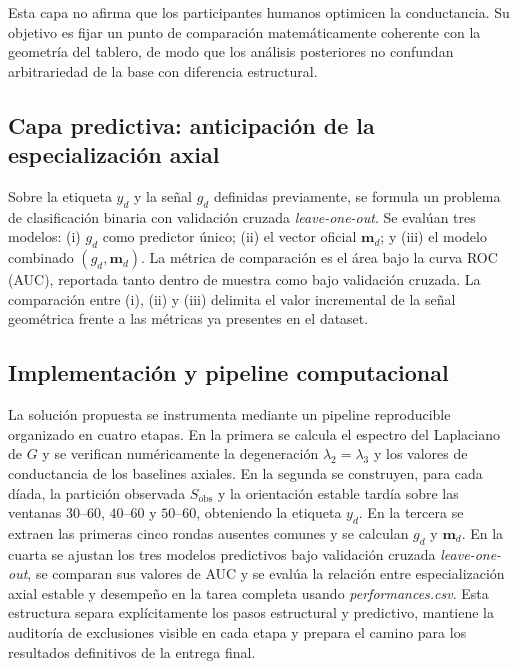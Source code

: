 \documentclass[journal]{IEEEtran}
\newcommand{\Sobs}{S_{\mathrm{obs}}}
\begin{document}
Esta capa no afirma que los participantes humanos optimicen la conductancia. Su objetivo es fijar un punto de comparación matemáticamente coherente con la geometría del tablero, de modo que los análisis posteriores no confundan arbitrariedad de la base con diferencia estructural.

\subsection{Capa predictiva: anticipación de la especialización axial}

Sobre la etiqueta $y_d$ y la señal $g_d$ definidas previamente, se formula un problema de clasificación binaria con validación cruzada \emph{leave-one-out}. Se evalúan tres modelos: (i) $g_d$ como predictor único; (ii) el vector oficial $\mathbf{m}_d$; y (iii) el modelo combinado $(g_d, \mathbf{m}_d)$. La métrica de comparación es el área bajo la curva ROC (AUC), reportada tanto dentro de muestra como bajo validación cruzada. La comparación entre (i), (ii) y (iii) delimita el valor incremental de la señal geométrica frente a las métricas ya presentes en el dataset.

\subsection{Implementación y pipeline computacional}

La solución propuesta se instrumenta mediante un pipeline reproducible organizado en cuatro etapas. En la primera se calcula el espectro del Laplaciano de $G$ y se verifican numéricamente la degeneración $\lambda_2=\lambda_3$ y los valores de conductancia de los baselines axiales. En la segunda se construyen, para cada díada, la partición observada $\Sobs$ y la orientación estable tardía sobre las ventanas $30$--$60$, $40$--$60$ y $50$--$60$, obteniendo la etiqueta $y_d$. En la tercera se extraen las primeras cinco rondas ausentes comunes y se calculan $g_d$ y $\mathbf{m}_d$. En la cuarta se ajustan los tres modelos predictivos bajo validación cruzada \emph{leave-one-out}, se comparan sus valores de AUC y se evalúa la relación entre especialización axial estable y desempeño en la tarea completa usando \emph{performances.csv}. Esta estructura separa explícitamente los pasos estructural y predictivo, mantiene la auditoría de exclusiones visible en cada etapa y prepara el camino para los resultados definitivos de la entrega final.
\end{document}
